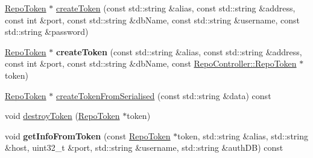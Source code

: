 \begin{DoxyCompactItemize}
\item 
\hyperlink{class_repo_controller_1_1_repo_token}{Repo\+Token} $\ast$ \hyperlink{classrepo_1_1_repo_controller_af0114adeb2f26b2eb77695419cc0a9d6}{create\+Token} (const std\+::string \&alias, const std\+::string \&address, const int \&port, const std\+::string \&db\+Name, const std\+::string \&username, const std\+::string \&password)
\item 
\hypertarget{classrepo_1_1_repo_controller_a94ad974c03b84ae5a1905d94d9cfdc02}{}\hyperlink{class_repo_controller_1_1_repo_token}{Repo\+Token} $\ast$ {\bfseries create\+Token} (const std\+::string \&alias, const std\+::string \&address, const int \&port, const std\+::string \&db\+Name, const \hyperlink{class_repo_controller_1_1_repo_token}{Repo\+Controller\+::\+Repo\+Token} $\ast$token)\label{classrepo_1_1_repo_controller_a94ad974c03b84ae5a1905d94d9cfdc02}

\item 
\hyperlink{class_repo_controller_1_1_repo_token}{Repo\+Token} $\ast$ \hyperlink{classrepo_1_1_repo_controller_aeb2f00d732ab2e056221e8eeef4cdca0}{create\+Token\+From\+Serialised} (const std\+::string \&data) const 
\item 
void \hyperlink{classrepo_1_1_repo_controller_a115816273eb113352fd32adafd543866}{destroy\+Token} (\hyperlink{class_repo_controller_1_1_repo_token}{Repo\+Token} $\ast$token)
\item 
\hypertarget{classrepo_1_1_repo_controller_a08881a2306a358e49b9f26b06bfd4254}{}void {\bfseries get\+Info\+From\+Token} (const \hyperlink{class_repo_controller_1_1_repo_token}{Repo\+Token} $\ast$token, std\+::string \&alias, std\+::string \&host, uint32\+\_\+t \&port, std\+::string \&username, std\+::string \&auth\+D\+B) const \label{classrepo_1_1_repo_controller_a08881a2306a358e49b9f26b06bfd4254}


\end{DoxyCompactItemize}
